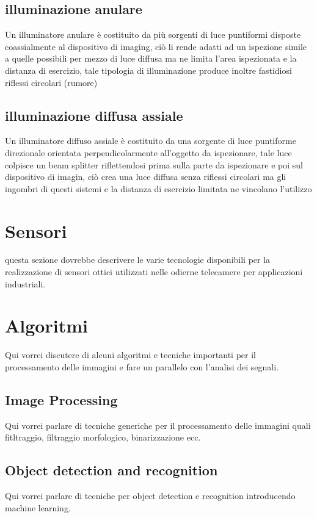 \subsection{illuminazione anulare}
Un illuminatore anulare è costituito da più sorgenti di luce 
puntiformi disposte coassialmente al dispositivo di 
imaging, ciò li rende adatti ad un ispezione simile a quelle 
possibili per mezzo di luce diffusa ma ne limita l’area 
ispezionata e la distanza di esercizio, tale tipologia di 
illuminazione produce inoltre fastidiosi riflessi circolari 
(rumore) 
 
\subsection{illuminazione diffusa assiale}
Un illuminatore diffuso assiale  è costituito da una 
sorgente di luce puntiforme direzionale orientata 
perpendicolarmente all’oggetto da ispezionare, tale luce 
colpisce un beam splitter riflettendosi prima sulla parte da 
ispezionare e poi sul dispositivo di imagin, ciò crea una 
luce diffusa senza riflessi circolari ma gli  ingombri di 
questi sistemi e la distanza di esercizio limitata ne 
vincolano l’utilizzo 

 


\section{Sensori}

questa sezione dovrebbe descrivere le varie tecnologie disponibili per la realizzazione di
sensori ottici utilizzati nelle odierne telecamere per applicazioni industriali.

\section{Algoritmi}
Qui vorrei discutere di alcuni algoritmi e tecniche importanti per il processamento delle immagini
e fare un parallelo con l'analisi dei segnali.

\subsection{Image Processing}
Qui vorrei parlare di tecniche generiche per il processamento delle immagini quali fitltraggio, filtraggio
morfologico, binarizzazione ecc.

\subsection{Object detection and recognition}	
Qui vorrei parlare di tecniche per object detection e recognition introducendo machine learning.

\endinput
